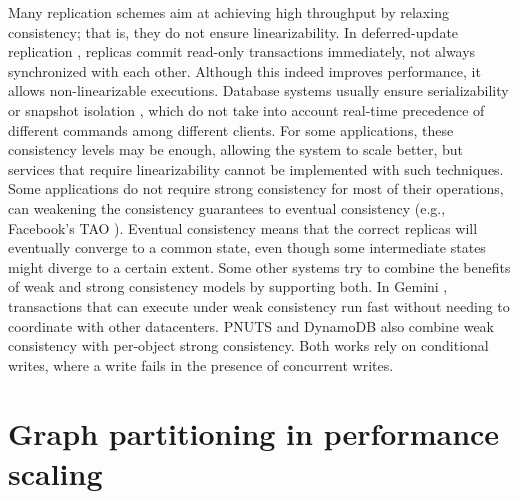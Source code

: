Many replication schemes aim at achieving high throughput by relaxing
consistency; that is, they do not ensure linearizability. In deferred-update
replication \cite{chundi96dur, kobus2013hybrid, sciascia2012sdur, SousaOMP01},
replicas commit read-only transactions immediately, not always synchronized
with each other. Although this indeed improves performance, it allows
non-linearizable executions. Database systems usually ensure serializability
\cite{BHG87} or snapshot isolation \cite{LinKJPA09}, which do not take into
account real-time precedence of different commands among different clients. For
some applications, these consistency levels may be enough, allowing the system
to scale better, but services that require linearizability cannot be implemented
with such techniques. Some applications do not require strong consistency for
most of their operations, can weakening the consistency guarantees to eventual
consistency (e.g., Facebook's TAO \cite{facebookTAO}). Eventual consistency
\cite{Gustavsson:2002eventual} means that the correct replicas will eventually
converge to a common state, even though some intermediate states might diverge
to a certain extent. Some other systems try to combine the benefits of weak and
strong consistency models by supporting both.  In Gemini \cite{Li2012geo},
transactions that can execute under weak consistency run fast without needing
to coordinate with other datacenters. PNUTS \cite{Cooper2008PNUTSYH} and
DynamoDB \cite{Sivasubramanian:2012dynamo} also combine weak consistency with
per-object strong consistency. Both works rely on conditional writes, where a
write fails in the presence of concurrent writes.

\section{Graph partitioning in performance scaling}


